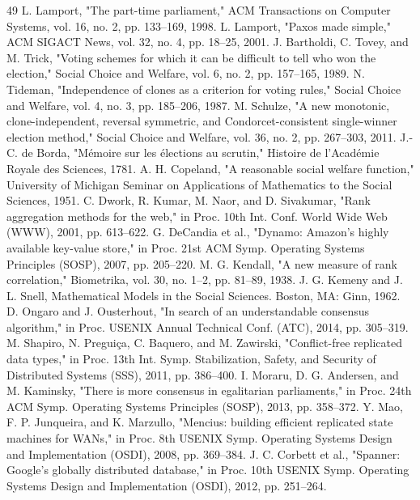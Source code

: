 \documentclass[11pt]{article}
\begin{document}
\begin{thebibliography}{49}
 L. Lamport, "The part-time parliament," ACM Transactions on Computer Systems, vol. 16, no. 2, pp. 133–169, 1998.
 L. Lamport, "Paxos made simple," ACM SIGACT News, vol. 32, no. 4, pp. 18–25, 2001.
 J. Bartholdi, C. Tovey, and M. Trick, "Voting schemes for which it can be difficult to tell who won the election," Social Choice and Welfare, vol. 6, no. 2, pp. 157–165, 1989.
 N. Tideman, "Independence of clones as a criterion for voting rules," Social Choice and Welfare, vol. 4, no. 3, pp. 185–206, 1987.
 M. Schulze, "A new monotonic, clone-independent, reversal symmetric, and Condorcet-consistent single-winner election method," Social Choice and Welfare, vol. 36, no. 2, pp. 267–303, 2011.
 J.-C. de Borda, "Mémoire sur les élections au scrutin," Histoire de l'Académie Royale des Sciences, 1781.
 A. H. Copeland, "A reasonable social welfare function," University of Michigan Seminar on Applications of Mathematics to the Social Sciences, 1951.
 C. Dwork, R. Kumar, M. Naor, and D. Sivakumar, "Rank aggregation methods for the web," in Proc. 10th Int. Conf. World Wide Web (WWW), 2001, pp. 613–622.
 G. DeCandia et al., "Dynamo: Amazon's highly available key-value store," in Proc. 21st ACM Symp. Operating Systems Principles (SOSP), 2007, pp. 205–220.
 M. G. Kendall, "A new measure of rank correlation," Biometrika, vol. 30, no. 1–2, pp. 81–89, 1938.
 J. G. Kemeny and J. L. Snell, Mathematical Models in the Social Sciences. Boston, MA: Ginn, 1962.
 D. Ongaro and J. Ousterhout, "In search of an understandable consensus algorithm," in Proc. USENIX Annual Technical Conf. (ATC), 2014, pp. 305–319.
 M. Shapiro, N. Preguiça, C. Baquero, and M. Zawirski, "Conflict-free replicated data types," in Proc. 13th Int. Symp. Stabilization, Safety, and Security of Distributed Systems (SSS), 2011, pp. 386–400.
 I. Moraru, D. G. Andersen, and M. Kaminsky, "There is more consensus in egalitarian parliaments," in Proc. 24th ACM Symp. Operating Systems Principles (SOSP), 2013, pp. 358–372.
 Y. Mao, F. P. Junqueira, and K. Marzullo, "Mencius: building efficient replicated state machines for WANs," in Proc. 8th USENIX Symp. Operating Systems Design and Implementation (OSDI), 2008, pp. 369–384.
 J. C. Corbett et al., "Spanner: Google's globally distributed database," in Proc. 10th USENIX Symp. Operating Systems Design and Implementation (OSDI), 2012, pp. 251–264.

\end{thebibliography}
\end{document}
